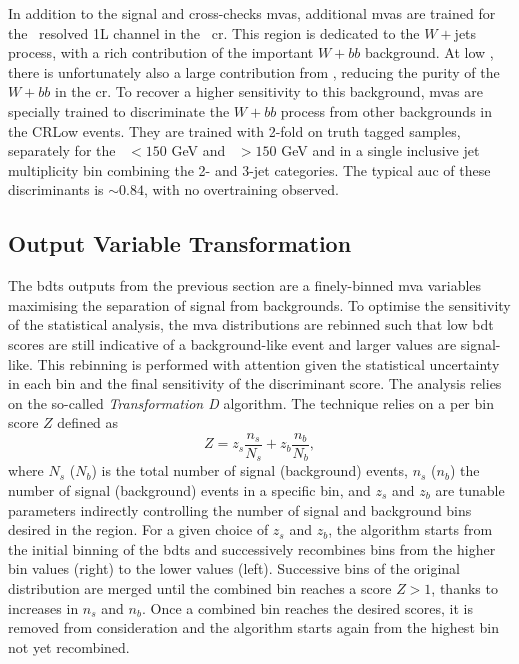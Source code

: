 \newpage
In addition to the signal and cross-checks \glspl{mva}, additional \glspl{mva} are trained for the \vhb\ resolved 1L channel in the \lowdr\ \gls{cr}. This region is dedicated to the $W+$jets process, with a rich contribution of the important $W+bb$ background. At low \ptv, there is unfortunately also a large contribution from \ttb, reducing the purity of the $W+bb$ in the \gls{cr}. To recover a higher sensitivity to this background, \glspl{mva} are specially trained to discriminate the $W+bb$ process from other backgrounds in the CRLow events. They are trained with 2-fold on truth tagged samples, separately for the \ptv\ $< 150$ GeV and \ptv\ $> 150$ GeV and in a single inclusive jet multiplicity bin combining the 2- and 3-jet categories. The typical \gls{auc} of these discriminants is $\sim0.84$, with no overtraining observed.

\subsection{Output Variable Transformation}
The \glspl{bdt} outputs from the previous section are a finely-binned \gls{mva} variables maximising the separation of signal from backgrounds. To optimise the sensitivity of the statistical analysis, the \gls{mva} distributions are rebinned such that low \gls{bdt} scores are still indicative of a background-like event and larger values are signal-like. This rebinning is performed with attention given the statistical uncertainty in each bin and the final sensitivity of the discriminant score. The analysis relies on the so-called \textit{Transformation D} algorithm. The technique relies on a per bin score $Z$ defined as
\begin{equation}
    Z = z_s \frac{n_s}{N_s} + z_b \frac{n_b}{N_b},
\end{equation} 
where $N_s$ ($N_b$) is the total number of signal (background) events, $n_s$ ($n_b$) the number of signal (background) events in a specific bin, and $z_s$ and $z_b$ are tunable parameters indirectly controlling the number of signal and background bins desired in the region. For a given choice of $z_s$ and $z_b$, the algorithm starts from the initial binning of the \glspl{bdt} and successively recombines bins from the higher bin values (right) to the lower values (left). Successive bins of the original distribution are merged until the combined bin reaches a score $Z > 1$, thanks to increases in $n_s$ and $n_b$. Once a combined bin reaches the desired scores, it is removed from consideration and the algorithm starts again from the highest bin not yet recombined.\\

